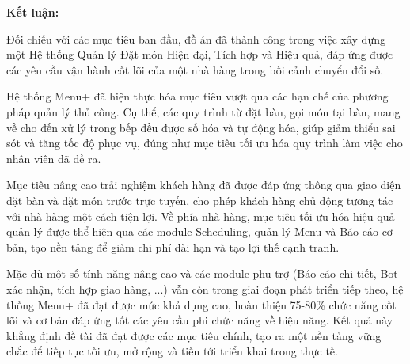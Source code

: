 \textbf{Kết luận:}

Đối chiếu với các mục tiêu ban đầu, đồ án đã thành công trong việc xây dựng một Hệ thống Quản lý Đặt món Hiện đại, Tích hợp và Hiệu quả, đáp ứng được các yêu cầu vận hành cốt lõi của một nhà hàng trong bối cảnh chuyển đổi số.

Hệ thống Menu+ đã hiện thực hóa mục tiêu vượt qua các hạn chế của phương pháp quản lý thủ công. Cụ thể, các quy trình từ đặt bàn, gọi món tại bàn, mang về cho đến xử lý trong bếp đều được số hóa và tự động hóa, giúp giảm thiểu sai sót và tăng tốc độ phục vụ, đúng như mục tiêu tối ưu hóa quy trình làm việc cho nhân viên đã đề ra.

Mục tiêu nâng cao trải nghiệm khách hàng đã được đáp ứng thông qua giao diện đặt bàn và đặt món trước trực tuyến, cho phép khách hàng chủ động tương tác với nhà hàng một cách tiện lợi. Về phía nhà hàng, mục tiêu tối ưu hóa hiệu quả quản lý được thể hiện qua các module Scheduling, quản lý Menu và Báo cáo cơ bản, tạo nền tảng để giảm chi phí dài hạn và tạo lợi thế cạnh tranh.

Mặc dù một số tính năng nâng cao và các module phụ trợ (Báo cáo chi tiết, Bot xác nhận, tích hợp giao hàng, ...) vẫn còn trong giai đoạn phát triển tiếp theo, hệ thống Menu+ đã đạt được mức khả dụng cao, hoàn thiện 75-80\% chức năng cốt lõi và cơ bản đáp ứng tốt các yêu cầu phi chức năng về hiệu năng. Kết quả này khẳng định đề tài đã đạt được các mục tiêu chính, tạo ra một nền tảng vững chắc để tiếp tục tối ưu, mở rộng và tiến tới triển khai trong thực tế.